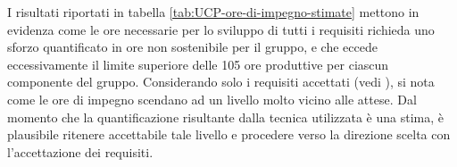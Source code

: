 I risultati riportati in tabella \ref{tab:UCP-ore-di-impegno-stimate} mettono in evidenza come le ore necessarie per lo sviluppo di tutti i requisiti richieda uno sforzo quantificato in ore non sostenibile per il gruppo, e che eccede eccessivamente il limite superiore delle 105 ore produttive per ciascun componente del gruppo. Considerando solo i requisiti accettati (vedi \AnalisiDeiRequisiti), si nota come le ore di impegno scendano ad un livello molto vicino alle attese. Dal momento che la quantificazione risultante dalla tecnica utilizzata è una stima, è plausibile ritenere accettabile tale livello e procedere verso la direzione scelta con l'accettazione dei requisiti.